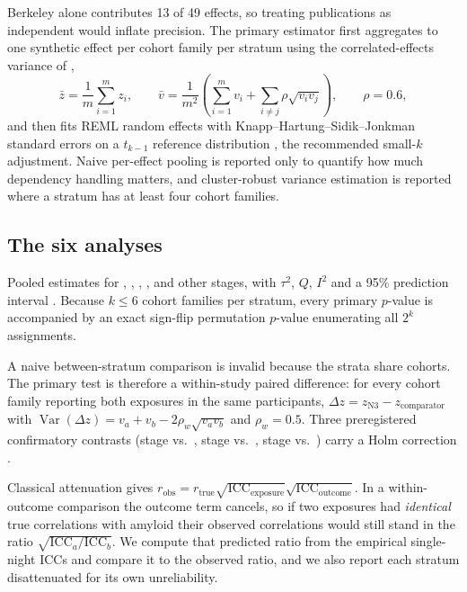 Berkeley alone contributes 13 of 49 effects, so treating publications as independent would
inflate precision. The primary estimator first aggregates to one synthetic effect per cohort
family per stratum using the correlated-effects variance of \citet{borenstein2009},
\begin{equation}
\bar{z} = \frac{1}{m}\sum_{i=1}^{m} z_i,
\qquad
\bar{v} = \frac{1}{m^{2}}\left(\sum_{i=1}^{m} v_i + \sum_{i \neq j} \rho \sqrt{v_i v_j}\right),
\qquad \rho = 0.6,
\label{eq:borenstein}
\end{equation}
and then fits REML random effects \citep{viechtbauer2005} with
Knapp--Hartung--Sidik--Jonkman standard errors on a $t_{k-1}$ reference distribution
\citep{knapp2003}, the recommended small-$k$ adjustment. Naive per-effect pooling is reported
only to quantify how much dependency handling matters, and cluster-robust variance estimation
\citep{hedges2010} is reported where a stratum has at least four cohort families.

\subsection{The six analyses}
\label{sec:experiments}

 Pooled estimates for \stage, \spectral, \tst, \se, \waso and
other stages, with $\tau^2$, $Q$, $I^2$ and a 95\% prediction interval \citep{higgins2009}.
Because $k \leq 6$ cohort families per stratum, every primary $p$-value is accompanied by an
exact sign-flip permutation $p$-value enumerating all $2^k$ assignments.

 A naive between-stratum comparison is invalid because the strata share
cohorts. The primary test is therefore a within-study paired difference: for every cohort family
reporting both exposures in the same participants,
$\Delta z = z_{\mathrm{N3}} - z_{\mathrm{comparator}}$ with
$\operatorname{Var}(\Delta z) = v_a + v_b - 2\rho_w\sqrt{v_a v_b}$ and $\rho_w = 0.5$. Three
preregistered confirmatory contrasts (stage vs.\ \tst, stage vs.\ \se, stage vs.\ \spectral)
carry a Holm correction \citep{holm1979}.

 Classical attenuation gives
$r_{\mathrm{obs}} = r_{\mathrm{true}}\sqrt{\mathrm{ICC}_{\mathrm{exposure}}}
\sqrt{\mathrm{ICC}_{\mathrm{outcome}}}$. In a within-outcome comparison the outcome term
cancels, so if two exposures had \emph{identical} true correlations with amyloid their observed
correlations would still stand in the ratio
$\sqrt{\mathrm{ICC}_a / \mathrm{ICC}_b}$. We compute that predicted ratio from the empirical
single-night ICCs and compare it to the observed ratio, and we also report each stratum
disattenuated for its own unreliability.

